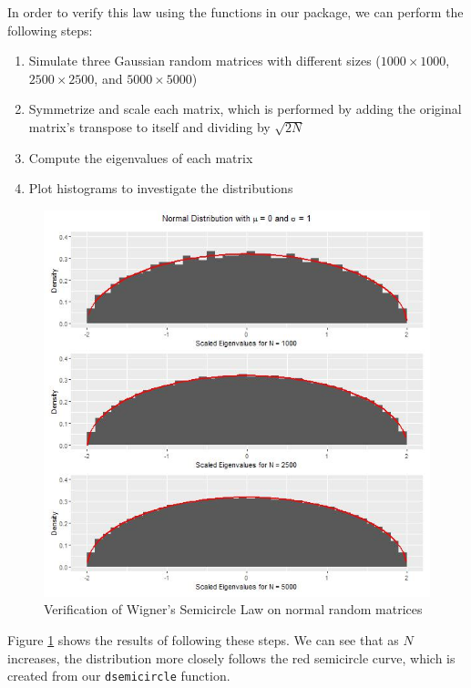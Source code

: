 \documentclass[11pt]{asaproc}
\begin{document}
In order to verify this law using the functions in our package, we can perform the following steps:
\begin{enumerate}
    \item Simulate three Gaussian random matrices with different sizes ($1000 \times 1000$, $2500 \times 2500$, and $5000 \times 5000$) \citep{jiang2021wigner}
    \item Symmetrize and scale each matrix, which is performed by adding the original matrix's transpose to itself and dividing by $\sqrt{2N}$
    \item Compute the eigenvalues of each matrix
    \item Plot histograms to investigate the distributions
\end{enumerate}

\begin{figure}[H]
    \centering
    \includegraphics[scale=0.38]{figures/SemiLaw.jpeg}
    \caption{Verification of Wigner's Semicircle Law on normal random matrices}
    \label{fig:semilaw}
\end{figure}

Figure \ref{fig:semilaw} shows the results of following these steps. We can see that as $N$ increases, the distribution more closely follows the red semicircle curve, which is created from our \texttt{dsemicircle} function.
\end{document}
